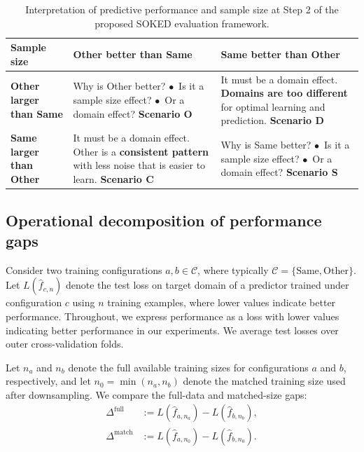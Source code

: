 \documentclass[twoside]{article}
\begin{document}
\begin{table}[!t]
\centering
\small
\caption{Interpretation of predictive performance and sample size at Step 2 of the proposed SOKED evaluation framework.}
\label{tab:scenario-interpretation}
\begin{tabular}{p{} p{} p{}}
\toprule
\textbf{Sample size} & \textbf{Other better than Same} & \textbf{Same better than Other} \\
\midrule
\textbf{Other larger than Same}
& Why is Other better?
\newline $\bullet$\ Is it a sample size effect?
\newline $\bullet$\ Or a domain effect?
\newline \textbf{Scenario O}
& It must be a domain effect. \textbf{Domains are too different} for optimal learning and prediction.
\newline \textbf{Scenario D} \\
\addlinespace
\textbf{Same larger than Other}
& It must be a domain effect. Other is a \textbf{consistent pattern} with less noise that is easier to learn.
\newline \textbf{Scenario C}
& Why is Same better?
\newline $\bullet$\ Is it a sample size effect?
\newline $\bullet$\ Or a domain effect?
\newline \textbf{Scenario S} \\
\bottomrule
\end{tabular}
\end{table}


\subsection{Operational decomposition of performance gaps}
Consider two training configurations $a,b \in \mathcal C$, where typically
$\mathcal C=\{\mathrm{Same},\mathrm{Other}\}$.
Let $L(\hat f_{c,n})$ denote the test loss on target domain of a predictor trained under configuration $c$ using $n$ training examples, where lower values indicate better performance.
Throughout, we express performance as a loss with lower values indicating better performance in our experiments.
We average test losses over outer cross-validation folds.

Let $n_a$ and $n_b$ denote the full available training sizes for configurations $a$ and $b$, respectively, and let $n_0 = \min(n_a,n_b)$ denote the matched training size used after downsampling.
We compare the full-data and matched-size gaps:
\begin{equation}
\begin{aligned}
\Delta^{\mathrm{full}}
&:= L(\hat f_{a,n_a}) - L(\hat f_{b,n_b}), \\
\Delta^{\mathrm{match}}
&:= L(\hat f_{a,n_0}) - L(\hat f_{b,n_0}).
\end{aligned}
\label{eq:gaps}
\end{equation}
\end{document}
